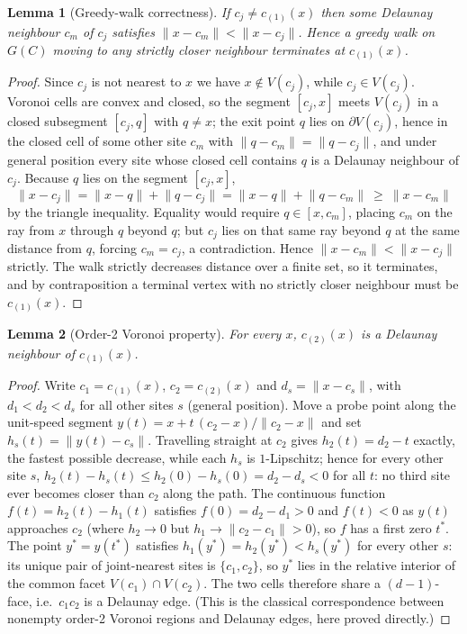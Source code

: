 \documentclass[review,12pt]{elsarticle}
\newtheorem{lemma}{Lemma}
\begin{document}
\begin{lemma}[Greedy-walk correctness]\label{lem:walk}
If $c_j\neq c_{(1)}(x)$ then some Delaunay neighbour $c_m$ of $c_j$
satisfies $\lVert x-c_m\rVert<\lVert x-c_j\rVert$. Hence a greedy walk
on $G(C)$ moving to any strictly closer neighbour terminates at
$c_{(1)}(x)$.
\end{lemma}
\begin{proof}
Since $c_j$ is not nearest to $x$ we have $x\notin V(c_j)$, while
$c_j\in V(c_j)$. Voronoi cells are convex and closed, so the segment
$[c_j,x]$ meets $V(c_j)$ in a closed subsegment $[c_j,q]$ with
$q\neq x$; the exit point $q$ lies on $\partial V(c_j)$, hence in the
closed cell of some other site $c_m$ with $\lVert q-c_m\rVert=\lVert
q-c_j\rVert$, and under general position every site whose closed cell
contains $q$ is a Delaunay neighbour of $c_j$. Because $q$ lies on the
segment $[c_j,x]$,
\[
\lVert x-c_j\rVert=\lVert x-q\rVert+\lVert q-c_j\rVert
=\lVert x-q\rVert+\lVert q-c_m\rVert\ \ge\ \lVert x-c_m\rVert
\]
by the triangle inequality. Equality would require $q\in[x,c_m]$,
placing $c_m$ on the ray from $x$ through $q$ beyond $q$; but $c_j$
lies on that same ray beyond $q$ at the same distance from $q$,
forcing $c_m=c_j$, a contradiction. Hence $\lVert x-c_m\rVert<\lVert
x-c_j\rVert$ strictly. The walk strictly decreases distance over a
finite set, so it terminates, and by contraposition a terminal vertex
with no strictly closer neighbour must be $c_{(1)}(x)$.
\end{proof}

\begin{lemma}[Order-2 Voronoi property]\label{lem:order2}
For every $x$, $c_{(2)}(x)$ is a Delaunay neighbour of $c_{(1)}(x)$.
\end{lemma}
\begin{proof}
Write $c_1=c_{(1)}(x)$, $c_2=c_{(2)}(x)$ and $d_s=\lVert
x-c_s\rVert$, with $d_1<d_2<d_s$ for all other sites $s$ (general
position). Move a probe point along the unit-speed segment
$y(t)=x+t\,(c_2-x)/\lVert c_2-x\rVert$ and set $h_s(t)=\lVert
y(t)-c_s\rVert$. Travelling straight at $c_2$ gives
$h_2(t)=d_2-t$ exactly, the fastest possible decrease, while each
$h_s$ is $1$-Lipschitz; hence for every other site $s$,
$h_2(t)-h_s(t)\le h_2(0)-h_s(0)=d_2-d_s<0$ for all $t$: no third site
ever becomes closer than $c_2$ along the path. The continuous
function $f(t)=h_2(t)-h_1(t)$ satisfies $f(0)=d_2-d_1>0$ and
$f(t)<0$ as $y(t)$ approaches $c_2$ (where $h_2\to 0$ but $h_1\to
\lVert c_2-c_1\rVert>0$), so $f$ has a first zero $t^\ast$. The point
$y^\ast=y(t^\ast)$ satisfies $h_1(y^\ast)=h_2(y^\ast)<h_s(y^\ast)$
for every other $s$: its unique pair of joint-nearest sites is
$\{c_1,c_2\}$, so $y^\ast$ lies in the relative interior of the
common facet $V(c_1)\cap V(c_2)$. The two cells therefore share a
$(d{-}1)$-face, i.e.\ $c_1c_2$ is a Delaunay edge. (This is the
classical correspondence between nonempty order-2 Voronoi regions and
Delaunay edges, here proved directly.)
\end{proof}
\end{document}
